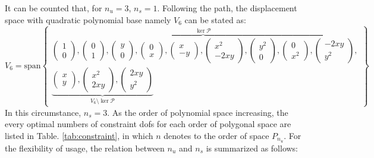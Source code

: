 It can be counted that, for $n_u = 3$, $n_s = 1$. Following the path, the displacement space with quadratic polynomial base namely $V_6$ can be stated as:
\begin{equation}\label{base2}
V_6 = \mathrm{span}
\begin{Bmatrix}
\overbrace{
\begin{pmatrix} 1 \\ 0 \end{pmatrix},
\begin{pmatrix} 0 \\ 1 \end{pmatrix},
\begin{pmatrix} y \\ 0 \end{pmatrix},
\begin{pmatrix} 0 \\ x \end{pmatrix},
\begin{pmatrix} x \\ -y \end{pmatrix},
\begin{pmatrix} x^2 \\ -2xy \end{pmatrix},
\begin{pmatrix} y^2 \\ 0 \end{pmatrix},
\begin{pmatrix} 0 \\ x^2 \end{pmatrix},
\begin{pmatrix} -2xy \\ y^2 \end{pmatrix}
}^{\ker \mathcal P}, \\
\underbrace{
\begin{pmatrix} x \\ y \end{pmatrix},
\begin{pmatrix} x^2 \\ 2xy \end{pmatrix},
\begin{pmatrix} 2xy \\ y^2 \end{pmatrix}
}_{V_6\setminus \ker \mathcal P}
\end{Bmatrix}
\end{equation}
In this circumstance, $n_s = 3$. As the order of polynomial space increasing, the every optimal numbers of constraint dofs for each order of polygonal space are listed in Table. \ref{tab:constraint}, 
in which $n$ denotes to the order of space $P_{n_u}$.
For the flexibility of usage, the relation between $n_u$ and $n_s$ is summarized as follows:

